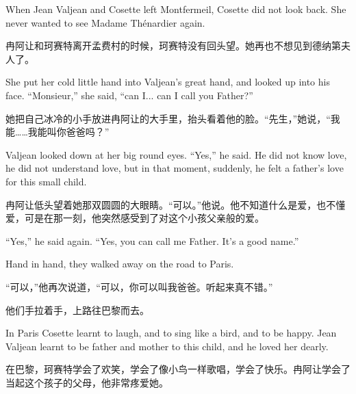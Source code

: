 \documentclass[fontset=ubuntu, zihao=5]{ctexart}
\begin{document}
\begin{paracol}{2}
  \switchcolumn*

  \sectionbreak

  When Jean Valjean and Cosette left Montfermeil, Cosette did not look back. She never wanted to see Madame Thénardier again.

  \switchcolumn

  \sectionbreak

  冉阿让和珂赛特离开孟费村的时候，珂赛特没有回头望。她再也不想见到德纳第夫人了。

  \switchcolumn*

  She put her cold little hand into Valjean's great hand, and looked up into his face. ``Monsieur,'' she said, ``can I... can I call you Father?''

  \switchcolumn

  她把自己冰冷的小手放进冉阿让的大手里，抬头看着他的脸。“先生，”她说，“我能……我能叫你爸爸吗？”

  \switchcolumn*

  Valjean looked down at her big round eyes. ``Yes,'' he said. He did not know love, he did not understand love, but in that moment, suddenly, he felt a father's love for this small child.

  \switchcolumn

  冉阿让低头望着她那双圆圆的大眼睛。“可以。”他说。他不知道什么是爱，也不懂爱，可是在那一刻，他突然感受到了对这个小孩父亲般的爱。

  \switchcolumn*

  ``Yes,'' he said again. ``Yes, you can call me Father. It's a good name.''


  Hand in hand, they walked away on the road to Paris.

  \switchcolumn

  “可以，”他再次说道，“可以，你可以叫我爸爸。听起来真不错。”

  他们手拉着手，上路往巴黎而去。

  \switchcolumn*

  \sectionbreak

  In Paris Cosette learnt to laugh, and to sing like a bird, and to be happy. Jean Valjean learnt to be father and mother to this child, and he loved her dearly.

  \switchcolumn

  \sectionbreak

  在巴黎，珂赛特学会了欢笑，学会了像小鸟一样歌唱，学会了快乐。冉阿让学会了当起这个孩子的父母，他非常疼爱她。

  \switchcolumn*


\end{paracol}
\end{document}
